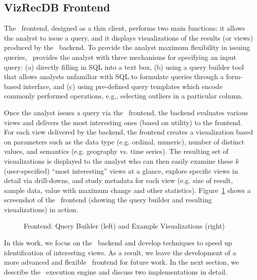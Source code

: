 

\subsection{VizRecDB Frontend}
\label{sec:VizRecDB_frontend}

The \VizRecDB\ frontend, designed as a thin client, performs two main functions: it
allows the analyst to issue a query, 
and it displays visualizations of the results (or views) produced by the \VizRecDB\
backend.
To provide the analyst maximum flexibility in issuing queries, \VizRecDB\
provides the analyst with three
mechanisms for specifying an input query: 
(a) directly filling in SQL into a text box, 
(b) using a query builder tool that allows analysts
unfamiliar with SQL to formulate queries through a form-based interface, and (c)
using pre-defined query templates which encode commonly performed operations,
e.g., selecting outliers in a particular column. 

Once the analyst issues a query via the \VizRecDB\ frontend, the backend
evaluates various views and delivers the most interesting ones (based on
utility) to the frontend.
For each view delivered by the backend, the frontend creates a visualization
based on parameters such as the data
type (e.g. ordinal, numeric), number of distinct values, and semantics (e.g.
geography vs. time series).
The resulting set of  visualizations is displayed to the analyst who can then
easily examine these $k$ (user-specified) ``most interesting'' views at a glance, 
explore specific views in detail via drill-downs, 
and study metadata for each view (e.g. size of result, sample data, value with
maximum change and other statistics). 
Figure~\ref{fig:frontend1} shows a screenshot of the \VizRecDB\ frontend (showing
the query builder and resulting visualizations) in action.
 
\begin{figure}[htb]
\vspace{-15pt}
\centerline{
\hbox{}
\hbox{}}
\vspace{-15pt}
\caption{Frontend: Query Builder (left) and Example Visualizations
(right)}
\label{fig:frontend1}
\vspace{-10pt}
\end{figure} 

In this work, we focus on the \VizRecDB\ backend and develop techniques to
speed up identification of interesting views. As a result, we leave the
development of a more advanced and flexible \VizRecDB\ frontend for future work. 
In the next section, we describe the \VizRecDB\ execution engine and discuss
two implementations in detail.
